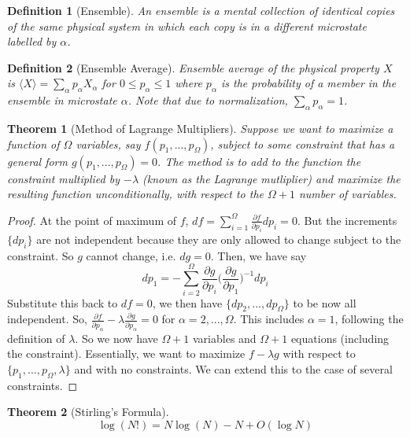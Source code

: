 \documentclass[a4paper]{article}
\theoremstyle{new}
\newtheorem{defi}{Definition}[section]
\newtheorem{thm}{Theorem}[section]
\begin{document}
\begin{defi}[Ensemble]
An ensemble is a mental collection of identical copies of the same physical system in which each copy is in a different microstate labelled by $\alpha$.
\end{defi}
\begin{defi}[Ensemble Average]
Ensemble average of the physical property $X$ is $\langle X\rangle=\sum_\alpha p_\alpha X_\alpha$ for $0\leq p_\alpha\leq 1$ where $p_\alpha$ is the probability of a member in the ensemble in microstate $\alpha$. Note that due to normalization, $\sum_\alpha p_\alpha=1$.
\end{defi}
\begin{thm}[Method of Lagrange Multipliers]
Suppose we want to maximize a function of $\Omega$ variables, say $f(p_1,...,p_\Omega)$, subject to some constraint that has a general form $g(p_1,...,p_\Omega)=0$. The method is to add to the function the constraint multiplied by $-\lambda$ (known as the Lagrange mutliplier) and maximize the resulting function unconditionally, with respect to the $\Omega+1$ number of variables.
\end{thm}
\begin{proof}
At the point of maximum of $f$, $df=\sum_{i=1}^\Omega\frac{\partial f}{\partial p_i}dp_i=0$. But the increments $\{dp_i\}$ are not independent because they are only allowed to change subject to the constraint. So $g$ cannot change, i.e. $dg=0$. Then, we have say
$$dp_1=-\sum_{i=2}^\Omega\frac{\partial g}{\partial p_i}\bigg(\frac{\partial g}{\partial p_1}\bigg)^{-1}dp_i$$
Substitute this back to $df=0$, we then have $\{dp_2,...,dp_\Omega\}$ to be now all independent. So, $\frac{\partial f}{\partial p_\alpha}-\lambda\frac{\partial g}{\partial p_\alpha}=0$ for $\alpha=2,...,\Omega$. This includes $\alpha=1$, following the definition of $\lambda$. So we now have $\Omega+1$ variables and $\Omega+1$ equations (including the constraint). Essentially, we want to maximize $f-\lambda g$ with respect to $\{p_1,...,p_\Omega,\lambda\}$ and with no constraints. We can extend this to the case of several constraints.
\end{proof}
\begin{thm}[Stirling's Formula]
\begin{equation}
\log(N!)=N\log(N)-N+O(\log N)\label{Stirling}
\end{equation}
\end{thm}
\newpage
\end{document}
